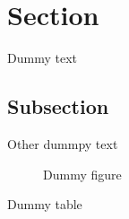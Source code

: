 \documentclass{article}
\begin{document}
\tableofcontents
\newpage
\section{Section}
Dummy text

\subsection{Subsection}
Other dummpy text

\begin{figure}
  \caption{Dummy figure}
\end{figure}

\begin{table}
  \caption{Dummy table}
\end{table}

\begin{appendix}
  \listoffigures
  \listoftables
\end{appendix}
\end{document}
